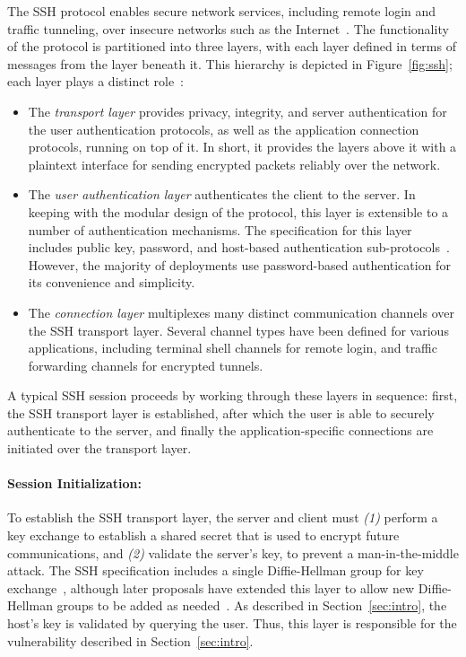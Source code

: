 The SSH protocol enables secure network services, including remote
login and traffic tunneling, over insecure networks such as the
Internet~\cite{rfc4251}. The functionality of the protocol is
partitioned into three layers, with each layer defined in terms of
messages from the layer beneath it. This hierarchy is depicted in
Figure~\ref{fig:ssh}; each layer plays a distinct role~\cite{rfc4251}:
\begin{itemize}
\item The \emph{transport layer} provides privacy, integrity, and
  server authentication for the user authentication protocols, as
  well as the application connection protocols, running on top of
  it. In short, it provides the layers above it with a plaintext
  interface for sending encrypted packets reliably over the network.
\item The \emph{user authentication layer} authenticates the client
  to the server. In keeping with the modular design of the protocol,
  this layer is extensible to a number of authentication
  mechanisms. The specification for this layer includes public key,
  password, and host-based authentication
  sub-protocols~\cite{rfc4252}. However, the majority of deployments
  use password-based authentication for its convenience and
  simplicity.
\item The \emph{connection layer} multiplexes many distinct
  communication channels over the SSH transport layer. Several channel
  types have been defined for various applications, including terminal
  shell channels for remote login, and traffic forwarding channels for
  encrypted tunnels.
\end{itemize}
A typical SSH session proceeds by working through these layers in
sequence: first, the SSH transport layer is established, after which
the user is able to securely authenticate to the server, and finally
the application-specific connections are initiated over the transport
layer.

\paragraph{Session Initialization:}

To establish the SSH transport layer, the server and client must
\textit{(1)} perform a key exchange to establish a shared secret that
is used to encrypt future communications, and \textit{(2)} validate
the server's key, to prevent a man-in-the-middle attack. The SSH
specification includes a single Diffie-Hellman group for key
exchange~\cite{rfc4251}, although later proposals have extended this
layer to allow new Diffie-Hellman groups to be added as
needed~\cite{rfc4419}. As described in Section~\ref{sec:intro}, the
host's key is validated by querying the user. Thus, this layer is
responsible for the vulnerability described in
Section~\ref{sec:intro}.

